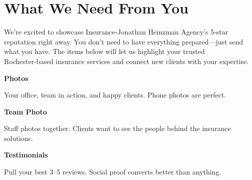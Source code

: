 \documentclass[11pt,letterpaper]{article}
\begin{document}
\vspace{0.2em}

\section*{What We Need From You}

We’re excited to showcase Insurance‑Jonathan Heinzman Agency’s 5‑star reputation right away. You don’t need to have everything prepared—just send what you have. The items below will let us highlight your trusted Rochester‑based insurance services and connect new clients with your expertise.

\vspace{0.12em}

\noindent\begin{minipage}[t]{0.48\textwidth}
\begin{tcolorbox}[colframe=accent-teal, boxrule=1pt, left=0.7em, right=0.7em, top=0.5em, bottom=0.5em, arc=4pt, boxsep=0pt]
{\bfseries\small\color{accent-teal}Photos}

\vspace{0.15em}

{\small Your office, team in action, and happy clients. Phone photos are perfect.}
\end{tcolorbox}

\vspace{0.1em}

\begin{tcolorbox}[colframe=accent-teal, boxrule=1pt, left=0.7em, right=0.7em, top=0.5em, bottom=0.5em, arc=4pt, boxsep=0pt]
{\bfseries\small\color{accent-teal}Team Photo}

\vspace{0.15em}

{\small Staff photos together. Clients want to see the people behind the insurance solutions.}
\end{tcolorbox}

\vspace{0.1em}

\begin{tcolorbox}[colframe=accent-teal, boxrule=1pt, left=0.7em, right=0.7em, top=0.5em, bottom=0.5em, arc=4pt, boxsep=0pt]
{\bfseries\small\color{accent-teal}Testimonials}

\vspace{0.15em}

{\small Pull your best 3–5 reviews. Social proof converts better than anything.}
\end{tcolorbox}
\end{minipage}
\end{document}
